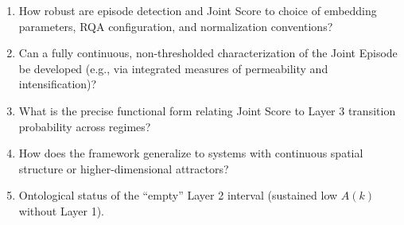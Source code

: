 \begin{enumerate}
    \item How robust are episode detection and Joint Score to choice of embedding parameters, RQA configuration, and normalization conventions?
    \item Can a fully continuous, non-thresholded characterization of the Joint Episode be developed (e.g., via integrated measures of permeability and intensification)?
    \item What is the precise functional form relating Joint Score to Layer 3 transition probability across regimes?
    \item How does the framework generalize to systems with continuous spatial structure or higher-dimensional attractors?
    \item Ontological status of the “empty” Layer 2 interval (sustained low $A(k)$ without Layer 1).
\end{enumerate}
